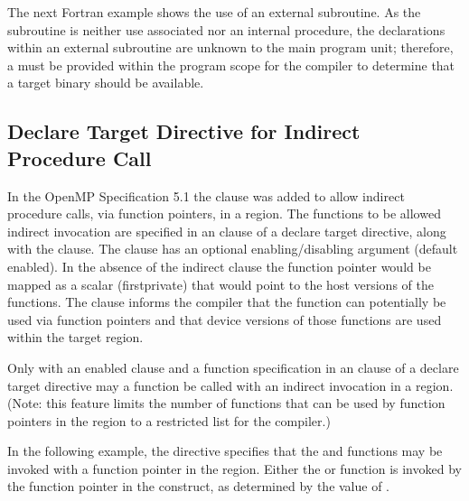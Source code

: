 \clearpage

The next Fortran example shows the use of an external subroutine. As the subroutine
is neither use associated nor an internal procedure, the 
declarations within an external subroutine are unknown to the main program unit; 
therefore, a  must be provided within the program
scope for the compiler to determine that a target binary should be available.


\subsection{Declare Target Directive for Indirect Procedure Call}
\label{subsec:indirect}


In the OpenMP Specification 5.1 the  clause was added to allow
indirect procedure calls, via function pointers, in a  region.
The functions to be allowed indirect invocation are specified in an  
clause of a declare target directive, along with the  clause.
The clause has an optional enabling/disabling argument (default enabled). In the 
absence of the indirect clause the function pointer would be mapped as a scalar 
(firstprivate) that would point to the host versions of the functions. 
The  clause informs the compiler that the function can potentially be 
used via function pointers and that device versions of those functions are used within 
the target region.

Only with an enabled  clause and a function specification in an  clause
of a declare target directive may a function be called with an indirect invocation in a  region.
(Note: this feature limits the number of functions that can be used by function 
pointers in the  region to a restricted list for the compiler.)

In the following example, the  
 directive specifies that the  and  functions may 
be invoked with a function pointer in the  region.
Either the  or  function is invoked by the  function 
pointer in the  construct, as determined by the value of .


